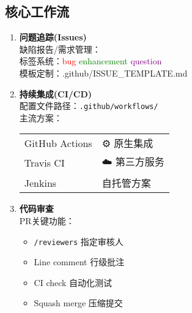 \subsection{核心工作流}
\begin{enumerate}[leftmargin=*, nosep]
    \item \textbf{问题追踪(Issues)}  \\
    缺陷报告/需求管理：\\
    标签系统：\textcolor{red}{bug} \textcolor{green}{enhancement} \textcolor{purple}{question} \\
    模板定制：.github/ISSUE\_TEMPLATE.md
    
    \item \textbf{持续集成(CI/CD)}  \\
    配置文件路径：\texttt{.github/workflows/} \\
    主流方案：\\
    \begin{tabular}{@{}ll@{}}
        GitHub Actions &  ⚙️ 原生集成 \\
        Travis CI &  ☁️ 第三方服务 \\
        Jenkins &  自托管方案 \\
    \end{tabular}
    
    \item \textbf{代码审查}  \\
    PR关键功能：\\
    
\begin{minipage}[t]{0.9\textwidth}
    \vspace{-2ex}
    \begin{itemize}[nosep,leftmargin=*]
        \item \texttt{/reviewers} 指定审核人
        \item Line comment 行级批注
        \item CI check 自动化测试
        \item Squash merge 压缩提交
    \end{itemize}
    \end{minipage}
\end{enumerate}

